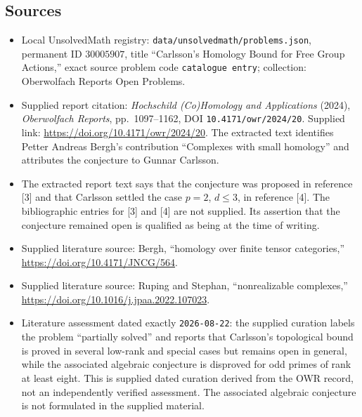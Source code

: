 \documentclass[11pt]{article}
\begin{document}
\subsection{Sources}
\begin{itemize}
\item Local UnsolvedMath registry: \texttt{data/unsolvedmath/problems.json}, permanent ID \(30005907\), title ``Carlsson's Homology Bound for Free Group Actions,'' exact source problem code \texttt{catalogue entry}; collection: Oberwolfach Reports Open Problems.
\item Supplied report citation: \emph{Hochschild (Co)Homology and Applications} (2024), \emph{Oberwolfach Reports}, pp.~1097--1162, DOI \texttt{10.4171/owr/2024/20}. Supplied link: \url{https://doi.org/10.4171/owr/2024/20}. The extracted text identifies Petter Andreas Bergh's contribution ``Complexes with small homology'' and attributes the conjecture to Gunnar Carlsson.
\item The extracted report text says that the conjecture was proposed in reference [3] and that Carlsson settled the case \(p=2\), \(d\leq 3\), in reference [4]. The bibliographic entries for [3] and [4] are not supplied. Its assertion that the conjecture remained open is qualified as being at the time of writing.
\item Supplied literature source: Bergh, ``homology over finite tensor categories,'' \url{https://doi.org/10.4171/JNCG/564}.
\item Supplied literature source: Ruping and Stephan, ``nonrealizable complexes,'' \url{https://doi.org/10.1016/j.jpaa.2022.107023}.
\item Literature assessment dated exactly \texttt{2026-08-22}: the supplied curation labels the problem ``partially solved'' and reports that Carlsson's topological bound is proved in several low-rank and special cases but remains open in general, while the associated algebraic conjecture is disproved for odd primes of rank at least eight. This is supplied dated curation derived from the OWR record, not an independently verified assessment. The associated algebraic conjecture is not formulated in the supplied material.
\end{itemize}
\end{document}
